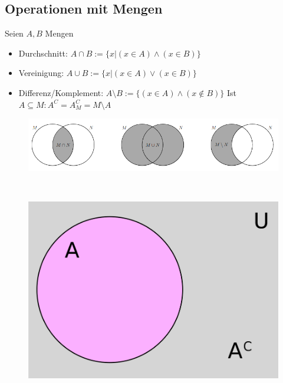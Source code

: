 \documentclass{article}
\begin{document}
        \subsection{Operationen mit Mengen}
            Seien $A,B$ Mengen
            \begin{itemize}
                \item Durchschnitt: $A\cap B :=\{x|(x\in A)\land (x\in B)\}$
                \item Vereinigung: $A\cup B :=\{x|(x\in A)\lor (x\in B)\}$
                \item Differenz/Komplement: $A\setminus B :=\{(x\in A)\land (x \notin B)\}$
                \subitem Ist $A\subseteq M: A^C=A^C_M=M\setminus A $
            \end{itemize}
            \begin{figure}[h]
                \centering
                \includegraphics[width=0.75\linewidth]{Mengen.png}
                \\
            \end{figure}\\
            \begin{figure}[h]
                \centering
                \includegraphics[width=0.25\linewidth]{Screenshot from 2023-10-26 12-00-55.png}
            \end{figure}
\end{document}
